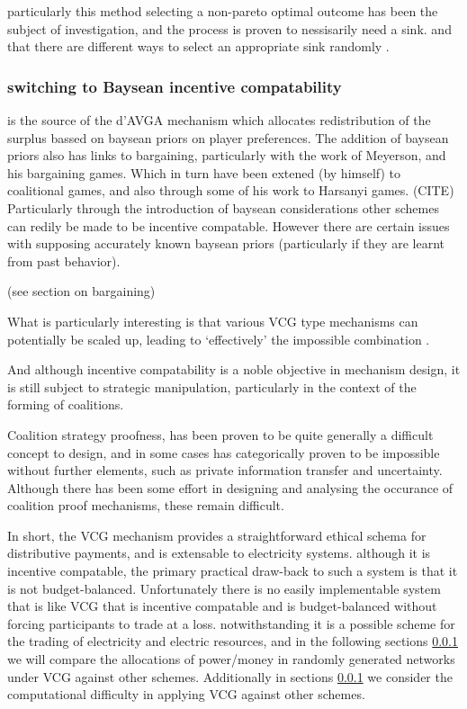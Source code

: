 particularly this method selecting a non-pareto optimal outcome has been the subject of investigation, and the process is proven to nessisarily need a sink.
and that there are different ways to select an appropriate sink randomly \cite{NATH2019673}.



\subsubsection{switching to Baysean incentive compatability}

is the source of the d'AVGA mechanism which allocates redistribution of the surplus bassed on baysean priors on player preferences.
The addition of baysean priors also has links to bargaining, particularly with the work of Meyerson, and his bargaining games.
Which in turn have been extened (by himself) to coalitional games, and also through some of his work to Harsanyi games. (CITE)
Particularly through the introduction of baysean considerations other schemes can redily be made to be incentive compatable.
However there are certain issues with supposing accurately known baysean priors (particularly if they are learnt from past behavior).

 (see section on bargaining)







What is particularly interesting is that various VCG type mechanisms can potentially be scaled up, leading to `effectively' the impossible combination \cite{NATH2019673, 8430852}.

And although incentive compatability is a noble objective in mechanism design, it is still subject to strategic manipulation, particularly in the context of the forming of coalitions.

Coalition strategy proofness, has been proven to be quite generally a difficult concept to design, and in some cases has categorically proven to be impossible \cite{10.2307/2297048} without further elements, such as private information transfer and uncertainty.
Although there has been some effort in designing and analysing the occurance of coalition proof mechanisms, these remain difficult.


In short, the VCG mechanism provides a straightforward ethical schema for distributive payments, and is extensable to electricity systems.
although it is incentive compatable, the primary practical draw-back to such a system is that it is not budget-balanced.
Unfortunately there is no easily implementable system that is like VCG that is incentive compatable and is budget-balanced without forcing participants to trade at a loss.
notwithstanding it is a possible scheme for the trading of electricity and electric resources, and in the following sections \ref{} we will compare the allocations of power/money in randomly generated networks under VCG against other schemes.
Additionally in sections \ref{} we consider the computational difficulty in applying VCG against other schemes.








